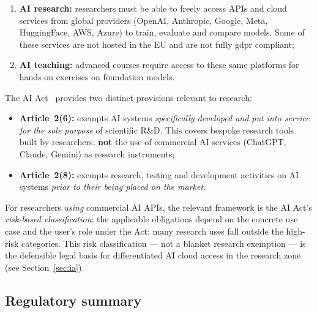 \begin{enumerate}
    \item \textbf{AI research:} researchers must be able to
    freely access APIs and cloud services from global providers
    (OpenAI, Anthropic, Google, Meta, HuggingFace, AWS, Azure) to
    train, evaluate and compare models. Some of these services
    are not hosted in the EU and are not fully \gls{gdpr}
    compliant;
    \item \textbf{AI teaching:} advanced courses require
    access to these same platforms for hands-on exercises on
    foundation models.
\end{enumerate}

The AI Act~\cite{eu-ai-act} provides two distinct provisions relevant
to research:
\begin{itemize}[nosep]
    \item \textbf{Article~2(6):} exempts AI systems
    \emph{specifically developed and put into service for the sole purpose}
    of scientific R\&D. This covers bespoke research tools built by
    researchers, \textbf{not} the use of commercial AI services
    (ChatGPT, Claude, Gemini) as research instruments;
    \item \textbf{Article~2(8):} exempts research, testing and development
    activities on AI systems \emph{prior to their being placed on the
    market}.
\end{itemize}
For researchers \emph{using} commercial AI APIs, the relevant
framework is the AI Act's \emph{risk-based classification}: the
applicable obligations depend on the concrete use case and the user's
role under the Act; many research uses fall outside the high-risk
categories. This risk classification ---
not a blanket research exemption --- is the defensible legal basis for
differentiated AI cloud access in the research zone (see
Section~\ref{sec:ia}).

\subsection{Regulatory summary}

